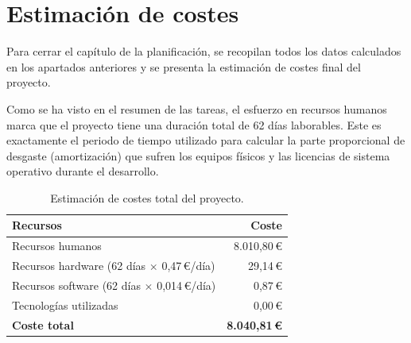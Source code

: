 \section{Estimación de costes}

Para cerrar el capítulo de la planificación, se recopilan todos los datos calculados en los
apartados anteriores y se presenta la estimación de costes final del proyecto.

Como se ha visto en el resumen de las tareas, el esfuerzo en recursos humanos marca que el
proyecto tiene una duración total de 62 días laborables. Este es exactamente el periodo de
tiempo utilizado para calcular la parte proporcional de desgaste (amortización) que sufren
los equipos físicos y las licencias de sistema operativo durante el desarrollo.

\begin{table}[H]
	\centering
	\caption{Estimación de costes total del proyecto.}
	\begin{tabularx}{0.85\textwidth}{X r}
		\toprule
		\textbf{Recursos} & \textbf{Coste} \\
		\midrule
		Recursos humanos                                        & 8.010,80\,\euro{} \\
		Recursos hardware (62 días $\times$ 0,47\,\euro{}/día)  & 29,14\,\euro{} \\
		Recursos software (62 días $\times$ 0,014\,\euro{}/día) & 0,87\,\euro{} \\
		Tecnologías utilizadas                                  & 0,00\,\euro{} \\
		\midrule
		\textbf{Coste total} & \textbf{8.040,81\,\euro{}} \\
		\bottomrule
	\end{tabularx}
\end{table}
